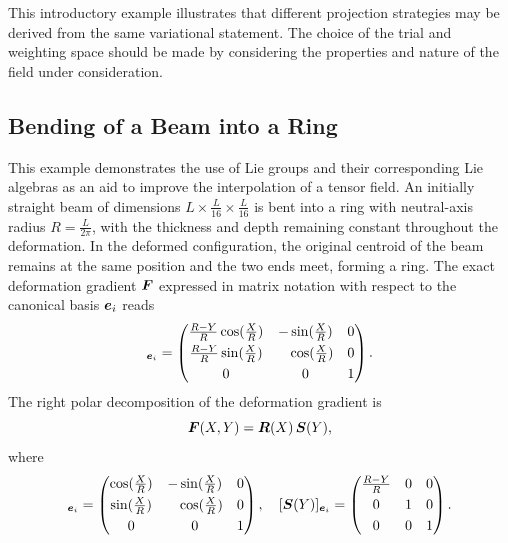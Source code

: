 \documentclass[12pt]{article}
\newcommand{\mbs}[1]{\boldsymbol{#1}}
\def\bS{{\mbs{S}}} \def\bT{{\mbs{T}}} \def\bU{{\mbs{U}}}
\begin{document}
This introductory example illustrates that different projection
strategies may be derived from the same variational statement. The
choice of the trial and weighting space should be made by considering
the properties and nature of the field under consideration.

\subsection{Bending of a Beam into a Ring}

This example demonstrates the use of Lie groups and their
corresponding Lie algebras as an aid to improve the interpolation of a
tensor field. An initially straight beam of dimensions $L \times
\frac{L}{16} \times \frac{L}{16}$ is bent into a ring with
neutral-axis radius $R = \frac{L}{2 \pi}$, with the thickness and
depth remaining constant throughout the deformation. In the deformed
configuration, the original centroid of the beam remains at the same
position and the two ends meet, forming a ring. The exact deformation
gradient $\bF$ expressed in matrix notation with respect to the
canonical basis $\be_i$ reads
\begin{equation}
  [\bF(X, Y)]_{\be_i} =
  \begin{pmatrix}
    \frac{R-Y}{R} \cos(\frac{X}{R}) & -\sin(\frac{X}{R}) & 0
    \\[0.3em]
    \frac{R-Y}{R} \sin(\frac{X}{R}) & \phantom{-}\cos(\frac{X}{R}) & 0
    \\[0.3em]
    0 & 0 & 1
  \end{pmatrix}.
  \label{eq:deformation-gradient} 
\end{equation}
The right polar decomposition of the deformation gradient is
\begin{equation}
  \bF(X,Y) = \bR(X) \, \bS(Y),
  \label{eq:right-polar}
\end{equation}
where
\begin{equation}
  [\bR(X)]_{\be_i} =
  \begin{pmatrix}
    \cos(\frac{X}{R}) & -\sin(\frac{X}{R}) & 0
    \\[0.3em]
    \sin(\frac{X}{R}) & \phantom{-}\cos(\frac{X}{R})  & 0
    \\[0.3em]
    0 & 0 & 1
  \end{pmatrix},
  \quad
  [\bS(Y)]_{\be_i} =
  \begin{pmatrix}
    \frac{R-Y}{R}  & 0 & 0
    \\[0.3em]
    0 & 1 & 0
    \\[0.3em]
    0 & 0 & 1
  \end{pmatrix}.
  \label{eq:polar-decomposition} 
\end{equation}
\end{document}
